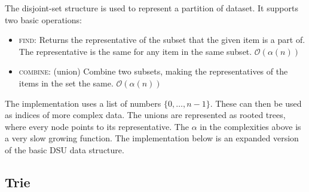 The disjoint-set structure is used to represent a partition of dataset. It supports two basic operations:
\begin{itemize}
    \item \textsc{find:} Returns the representative of the subset that the given item is a part of. The representative is the same for any item in the same subset. $\mathcal O(\alpha(n))$
    \item \textsc{combine:} (union) Combine two subsets, making the representatives of the items in the set the same. $\mathcal O(\alpha(n))$
\end{itemize}
\begin{figure}[H]
    \centering
\end{figure}
\vspace{-0.3cm}
The implementation uses a list of numbers $\{0, \dots, n - 1\}$. These can then be used as indices of more complex data. The unions are represented as rooted trees, where every node points to its representative. The $\alpha$ in the complexities above is a very slow growing function. The implementation below is an expanded version of the basic DSU data structure.



\subsection{Trie}

